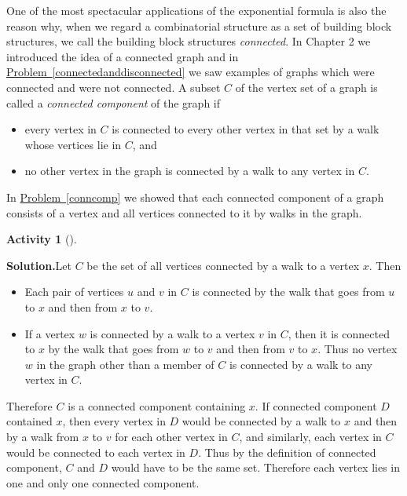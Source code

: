 \documentclass[10pt,]{book}
\theoremstyle{plain}
\theoremstyle{definition}
\newtheorem{activity}[project]{Activity}
\numberwithin{equation}{chapter}
\begin{document}
One of the most spectacular applications of the exponential formula is also the reason why, when we regard a combinatorial structure as a set of building block structures, we call the building block structures \emph{connected}. In Chapter 2 we introduced the idea of a connected graph and in \hyperref[connectedanddisconnected]{Problem~\ref{connectedanddisconnected}} we saw examples of graphs which were connected and were not connected. A subset \(C\) of the vertex set of a graph is called a \emph{connected component} of the graph if \leavevmode%
\begin{itemize}[label=\textbullet]
\item{}every vertex in \(C\) is connected to every other vertex in that set by a walk whose vertices lie in \(C\), and%
\item{}no other vertex in the graph is connected by a walk to any vertex in \(C\).%
\end{itemize}
%
\par
In \hyperref[conncomp]{Problem~\ref{conncomp}} we showed that each connected component of a graph consists of a vertex and all vertices connected to it by walks in the graph.%
\begin{activity}[]\label{activity-378}
\par\medskip\noindent%
\textbf{Solution.}\quad Let \(C\) be the set of all vertices connected by a walk to a vertex \(x\). Then \leavevmode%
\begin{itemize}[label=\textbullet]
\item{}Each pair of vertices \(u\) and \(v\) in \(C\) is connected by the walk that goes from \(u\) to \(x\) and then from \(x\) to \(v\).%
\item{}If a vertex \(w\) is connected by a walk to a vertex \(v\) in \(C\), then it is connected to \(x\) by the walk that goes from \(w\) to \(v\) and then from \(v\) to \(x\).  Thus no  vertex \(w\) in the graph other than a member of \(C\) is connected by a walk to any vertex in \(C\).%
\end{itemize}
%
\par
Therefore \(C\) is a connected component containing \(x\). If connected component \(D\) contained \(x\), then every vertex in \(D\) would be connected by a walk to \(x\) and then by a walk from \(x\) to \(v\) for each other vertex in \(C\), and similarly, each vertex in \(C\) would be connected to each vertex in \(D\). Thus by the definition of connected component, \(C\) and \(D\) would have to be the same set. Therefore each vertex lies in one and only one connected component.%
\end{activity}
\end{document}
